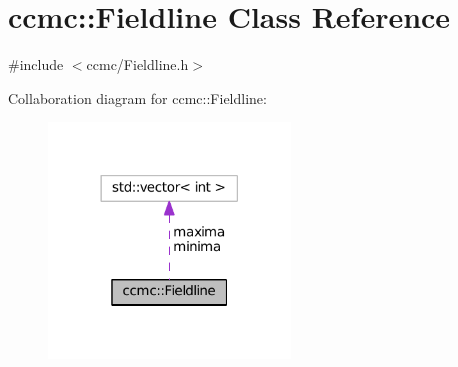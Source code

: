\hypertarget{classccmc_1_1_fieldline}{\section{ccmc\-:\-:Fieldline Class Reference}
\label{classccmc_1_1_fieldline}
}


{\ttfamily \#include $<$ccmc/\-Fieldline.\-h$>$}



Collaboration diagram for ccmc\-:\-:Fieldline\-:
\nopagebreak
\begin{figure}[H]
\begin{center}
\leavevmode
\includegraphics[width=182pt]{classccmc_1_1_fieldline__coll__graph}
\end{center}
\end{figure}
